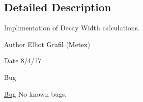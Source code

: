 \subsection{Detailed Description}
Implimentation of Decay Width calculations. 

\begin{DoxyAuthor}{Author}
Elliot Grafil (Metex) 
\end{DoxyAuthor}
\begin{DoxyDate}{Date}
8/4/17 
\end{DoxyDate}
\begin{DoxyRefDesc}{Bug}
\item[\hyperlink{bug__bug000022}{Bug}]No known bugs. \end{DoxyRefDesc}
